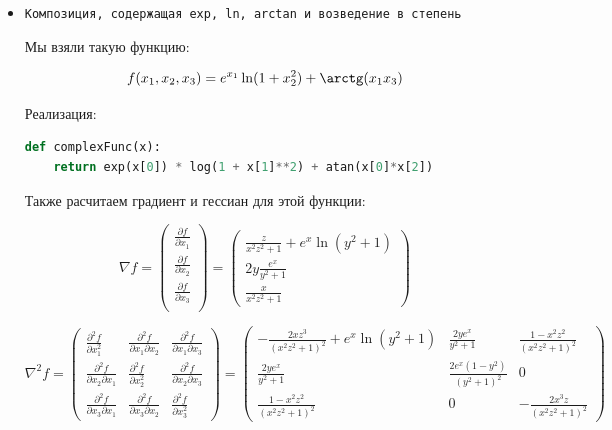 \documentclass[a4paper,12pt]{article}
\begin{document}
\begin{itemize}
\begin{lstlisting}[language=python, caption=Градиент и гессиан для полинома нескольких переменных]
def exactHessPoly(x):
	return np.array([
	[6*x[0] + 4*x[1], 4*x[0] - 6*x[1], x[1]],
	[4*x[0] - 6*x[1], -6*x[0] + 6*x[1], x[0]],
	[x[1], x[0], 0]
	])
\end{lstlisting}

\item \texttt{Композиция, содержащая exp, ln, arctan и возведение в степень}

Мы взяли такую функцию:

\[
f(x_1, x_2, x_3) = e^{x_1} \ln(1 + x_2^2) + \arctg(x_1 x_3)
\]

Реализация:


\begin{lstlisting}[language=python, caption=Композиция нескольких функций]
def complexFunc(x):
	return exp(x[0]) * log(1 + x[1]**2) + atan(x[0]*x[2])
\end{lstlisting}

Также расчитаем градиент и гессиан для этой функции:

\[
\nabla f =
\begin{pmatrix}
	\frac{\partial f}{\partial x_1} \\ 
	\frac{\partial f}{\partial x_2} \\
	\frac{\partial f}{\partial x_3} \\
	
\end{pmatrix} 
= 
 \begin{pmatrix}
	\frac{z}{x^2 z^2 + 1} + e^x \ln(y^2 + 1) \\
	2 y \frac{e^x}{y^2 + 1} \\
	\frac{x}{x^2 z^2 + 1}
\end{pmatrix}
\]

\[
\nabla^2 f = 
\begin{pmatrix}
	\frac{\partial^2 f}{\partial x_1^2} & \frac{\partial^2 f}{\partial x_1 \partial x_2} & \frac{\partial^2 f}{\partial x_1 \partial x_3} \\
	\frac{\partial^2 f}{\partial x_2 \partial x_1} & \frac{\partial^2 f}{\partial x_2^2} & \frac{\partial^2 f}{\partial x_2 \partial x_3} \\
	\frac{\partial^2 f}{\partial x_3 \partial x_1} & \frac{\partial^2 f}{\partial x_3 \partial x_2} & \frac{\partial^2 f}{\partial x_3^2}
\end{pmatrix}
= 
\begin{pmatrix}
	-\frac{2 x z^3}{(x^2 z^2 + 1)^2} + e^x \ln(y^2 + 1) & \frac{2 y e^x}{y^2 + 1} & \frac{1 - x^2 z^2}{(x^2 z^2 + 1)^2} \\
	\frac{2 y e^x}{y^2 + 1} & \frac{2 e^x (1 - y^2)}{(y^2 + 1)^2} & 0 \\
	\frac{1 - x^2 z^2}{(x^2 z^2 + 1)^2} & 0 & -\frac{2 x^3 z}{(x^2 z^2 + 1)^2}
\end{pmatrix}
\]


\end{itemize}
\end{document}
